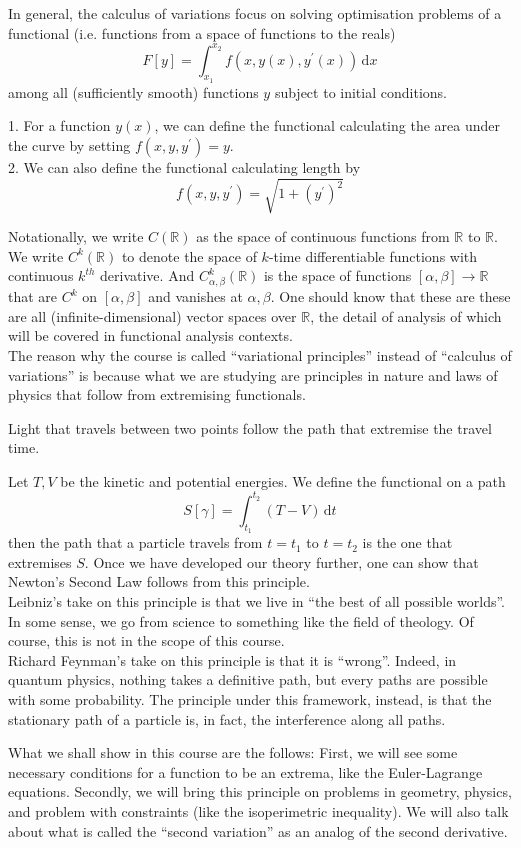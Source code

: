 \documentclass[a4paper]{article}
\begin{document}
In general, the calculus of variations focus on solving optimisation problems of a functional (i.e. functions from a space of functions to the reals)
$$F[y]=\int_{x_1}^{x_2}f(x,y(x),y^\prime(x))\,\mathrm dx$$
among all (sufficiently smooth) functions $y$ subject to initial conditions.
\begin{example}
    1. For a function $y(x)$, we can define the functional calculating the area under the curve by setting $f(x,y,y^\prime)=y$.\\
    2. We can also define the functional calculating length by
    $$f(x,y,y^\prime)=\sqrt{1+(y^\prime)^2}$$
\end{example}
Notationally, we write $C(\mathbb R)$ as the space of continuous functions from $\mathbb R$ to $\mathbb R$.
We write $C^k(\mathbb R)$ to denote the space of $k$-time differentiable functions with continuous $k^{th}$ derivative.
And $C^k_{\alpha,\beta}(\mathbb R)$ is the space of functions $[\alpha,\beta]\to\mathbb R$ that are $C^k$ on $[\alpha,\beta]$ and vanishes at $\alpha,\beta$.
One should know that these are these are all (infinite-dimensional) vector spaces over $\mathbb R$, the detail of analysis of which will be covered in functional analysis contexts.\\
The reason why the course is called ``variational principles'' instead of ``calculus of variations'' is because what we are studying are principles in nature and laws of physics that follow from extremising functionals.
\begin{example}
    Light that travels between two points follow the path that extremise the travel time.
\end{example}
\begin{example}
    Let $T,V$ be the kinetic and potential energies.
    We define the functional on a path
    $$S[\gamma]=\int_{t_1}^{t_2}(T-V)\,\mathrm dt$$
    then the path that a particle travels from $t=t_1$ to $t=t_2$ is the one that extremises $S$.
    Once we have developed our theory further, one can show that Newton's Second Law follows from this principle.\\
    Leibniz's take on this principle is that we live in ``the best of all possible worlds''.
    In some sense, we go from science to something like the field of theology.
    Of course, this is not in the scope of this course.\\
    Richard Feynman's take on this principle is that it is ``wrong''.
    Indeed, in quantum physics, nothing takes a definitive path, but every paths are possible with some probability.
    The principle under this framework, instead, is that the stationary path of a particle is, in fact, the interference along all paths.
\end{example}
What we shall show in this course are the follows:
First, we will see some necessary conditions for a function to be an extrema, like the Euler-Lagrange equations.
Secondly, we will bring this principle on problems in geometry, physics, and problem with constraints (like the isoperimetric inequality).
We will also talk about what is called the ``second variation'' as an analog of the second derivative.
\newpage
\end{document}
